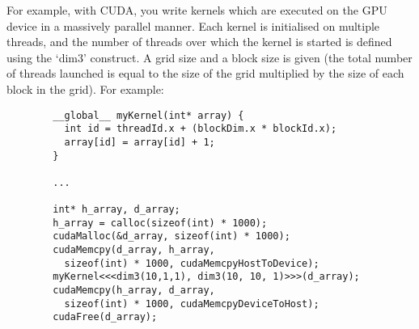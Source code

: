 \documentclass{report}
\begin{document}
\begin{enumerate}
\begin{enumerate}
\begin{itemize}
      For example, with CUDA, you write kernels which are executed on
      the GPU device in a massively parallel manner. Each kernel is
      initialised on multiple threads, and the number of threads over
      which the kernel is started is defined using the `dim3'
      construct. A grid size and a block size is given (the total
      number of threads launched is equal to the size of the grid
      multiplied by the size of each block in the grid). For example:

      \begin{verbatim}
        __global__ myKernel(int* array) {
          int id = threadId.x + (blockDim.x * blockId.x);
          array[id] = array[id] + 1;
        }

        ...

        int* h_array, d_array;
        h_array = calloc(sizeof(int) * 1000);
        cudaMalloc(&d_array, sizeof(int) * 1000);
        cudaMemcpy(d_array, h_array,
          sizeof(int) * 1000, cudaMemcpyHostToDevice);
        myKernel<<<dim3(10,1,1), dim3(10, 10, 1)>>>(d_array);
        cudaMemcpy(h_array, d_array,
          sizeof(int) * 1000, cudaMemcpyDeviceToHost);
        cudaFree(d_array);
      \end{verbatim}
    \end{itemize}
  \end{enumerate}
\end{enumerate}         
\end{document}
